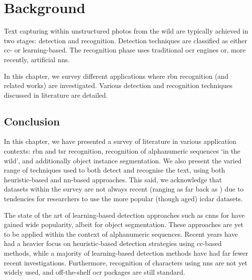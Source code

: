 \chapter{Background}
\label{ch:background}


Text capturing within unstructured photos from the wild are typically achieved in two stages: detection and recognition. Detection techniques are classified as either \gls{cc}- or learning-based. The recognition phase uses traditional \gls{ocr} engines or, more recently, artificial \glspl{nn}. 

In this chapter, we survey different applications where \gls{rbn} recognition (and related works) are investigated. Various detection and recognition techniques discussed in literature are detailed.





\newpage
\section{Conclusion}

In this chapter, we have presented a survey of literature in various application contexts: \gls{rbn} and \gls{tsr} recognition, recognition of alphanumeric sequences `in the wild', and additionally object instance segmentation. We also present the varied range of techniques used to both detect and recognise the text, using both heuristic-based and \gls{nn}-based approaches. This said, we acknowledge that datasets within the survey are not always recent (ranging as far back as \citeyear{Lucas:2003iw}) due to tendencies for researchers to use the more popular (though aged) \gls{icdar} datasets.

The state of the art of learning-based detection approaches such as \glspl{cnn} for have gained wide popularity, albeit for object segmentation. These approaches are yet to be applied within the context of alphanumeric sequences. Recent years have had a heavier focus on heuristic-based detection strategies using \gls{cc}-based methods, while a majority of learning-based detection methods have had far fewer recent investigations. Furthermore, recognition of characters using \glspl{nn} are not yet widely used, and off-the-shelf \gls{ocr} packages are still standard.